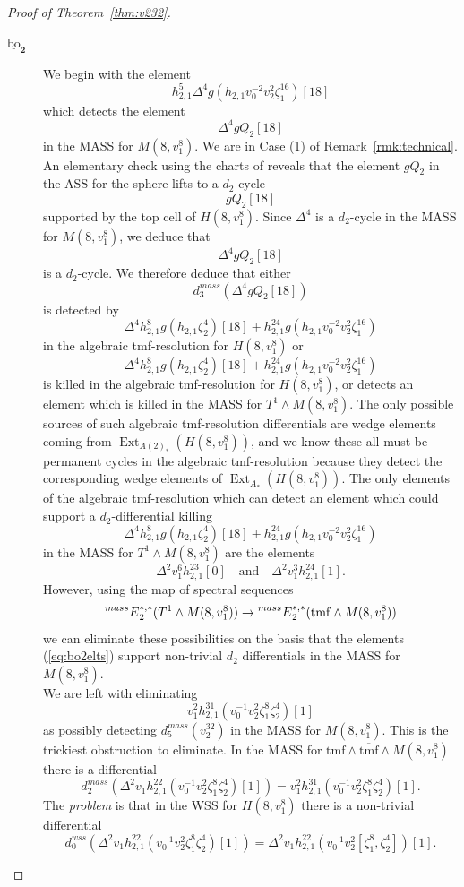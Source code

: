 \documentclass[10pt]{amsart}
\newcommand{\ul}[1]{\underline{#1}}
\newcommand{\mr}[1]{\mathrm{#1}}
\newcommand{\br}[1]{\overline{#1}}
\newcommand{\tmf}{\mathrm{tmf}}
\newcommand{\bo}{\mathrm{bo}}
\newcommand{\bou}{\ul{\bo}}
\theoremstyle{definition}
\numberwithin{equation}{section}
\numberwithin{figure}{section}
\DeclareMathOperator{\Ext}{Ext}
\newcommand{\E}[2]{\prescript{#1}{#2}{E}}
\begin{document}
\begin{proof}[Proof of Theorem~\ref{thm:v232}]
\begin{description}
\item[$\pmb{\bou_2}$] We begin with the element 
$$ h_{2,1}^5 \Delta^4 g(h_{2,1} v_0^{-2}v_2^2 \zeta_1^{16})[18] $$
which detects the element
$$ \Delta^4 gQ_2[18] $$
in the MASS for $M(8,v_1^8)$.  We are in Case (1) of Remark~\ref{rmk:technical}.
An elementary check using the charts of \cite{IsaksenChart} reveals that the element $gQ_2$ in the ASS for the sphere lifts to a $d_2$-cycle
$$ gQ_2[18] $$
supported by the top cell of $H(8,v_1^8)$.  Since $\Delta^4$ is a $d_2$-cycle in the MASS for $M(8,v_1^8)$, we deduce that
$$ \Delta^4 gQ_2[18] $$
is a $d_2$-cycle.
We therefore deduce that either 
$$ d_3^{mass}(\Delta^4gQ_2[18]) $$
is detected by 
$$ \Delta^4 h_{2,1}^{8} g(h_{2,1} \zeta_2^4)[18] + h_{2,1}^{24} g(h_{2,1} v_0^{-2}v_2^2 \zeta_1^{16}) $$
in the algebraic tmf-resolution for $H(8,v_1^8)$ or 
$$ \Delta^4 h_{2,1}^{8} g(h_{2,1} \zeta_2^4)[18] + h_{2,1}^{24} g(h_{2,1} v_0^{-2}v_2^2 \zeta_1^{16}) $$
is killed in the algebraic tmf-resolution for $H(8,v_1^8)$, or detects an element which is killed in the MASS for $T^1 \wedge M(8,v_1^8)$.  The only possible sources of such algebraic tmf-resolution differentials are wedge elements coming from $\Ext_{A(2)_*}(H(8,v_1^8))$, and we know these all must be permanent cycles in the algebraic tmf-resolution because they detect the corresponding wedge elements of $\Ext_{A_*}(H(8,v_1^8))$.  The only elements of the algebraic tmf-resolution which can detect an element which could support a $d_2$-differential killing 
$$ \Delta^4 h_{2,1}^{8} g(h_{2,1} \zeta_2^4)[18] + h_{2,1}^{24} g(h_{2,1} v_0^{-2}v_2^2\zeta_1^{16}) $$
in the MASS for $T^1 \wedge M(8,v_1^8)$ are the elements
\begin{equation}\label{eq:bo2elts}
\Delta^2 v_1^6 h_{2,1}^{23} [0] \quad \mr{and} \quad \Delta^2 v_1^3 h_{2,1}^{24} [1].
\end{equation}
However, using the map of spectral sequences
$$ \E{mass}{}_2^{*,*}(T^1 \wedge M(8,v_1^8)) \rightarrow \E{mass}{}_2^{*,*}(\tmf \wedge M(8,v_1^8)) $$
we can eliminate these possibilities on the basis that the elements (\ref{eq:bo2elts}) support non-trivial $d_2$ differentials in the MASS for $M(8,v_1^8)$.
$$ \quad $$
We are left with eliminating 
$$ v_1^2 h_{2,1}^{31}(v_0^{-1}v_2^2\zeta_1^8\zeta_2^4)[1] $$
as possibly detecting $d_5^{mass}(v_2^{32})$ in the MASS for $M(8,v_1^8)$.  This is the trickiest obstruction to eliminate.  In the MASS for $\tmf \wedge \br{\tmf} \wedge M(8,v_1^8)$ there is a differential
$$ d^{mass}_2(\Delta^2 v_1 h_{2,1}^{22}(v_0^{-1}v_2^2\zeta_1^8\zeta_2^4)[1]) = 
v_1^2 h_{2,1}^{31}(v_0^{-1}v_2^2\zeta_1^8\zeta_2^4)[1]. $$
The \emph{problem} is that in the WSS for $H(8,v_1^8)$ there is a non-trivial differential
$$ d^{wss}_0(\Delta^2 v_1 h_{2,1}^{22}(v_0^{-1}v_2^2\zeta_1^8\zeta_2^4)[1])
= \Delta^2 v_1 h_{2,1}^{22}(v_0^{-1}v_2^2[\zeta_1^8,\zeta_2^4])[1]. $$


\end{description}
\end{proof}
\end{document}
